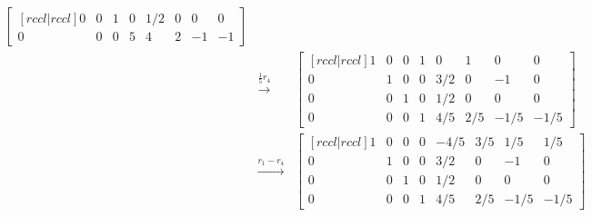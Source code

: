 \begin{solution}
\begin{eqnarray*}
\begin{bmatrix}[rccl|rccl]
0&0&1&0&1/2&0&0&0\\
0&0&0&5&4&2&-1&-1
\end{bmatrix}\\
&\xrightarrow[]{\frac{1}{5}r_4}&
\begin{bmatrix}[rccl|rccl]
1&0&0&1&0&1&0&0\\
0&1&0&0&3/2&0&-1&0\\
0&0&1&0&1/2&0&0&0\\
0&0&0&1&4/5&2/5&-1/5&-1/5
\end{bmatrix}\\
&\xrightarrow[]{r_1 - r_4}&
\begin{bmatrix}[rccl|rccl]
1&0&0&0&-4/5&3/5&1/5&1/5\\
0&1&0&0&3/2&0&-1&0\\
0&0&1&0&1/2&0&0&0\\
0&0&0&1&4/5&2/5&-1/5&-1/5
\end{bmatrix}\\
\end{eqnarray*}
\end{solution}

